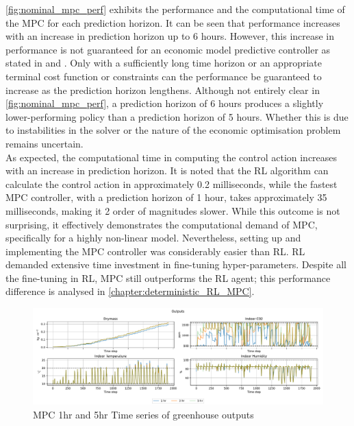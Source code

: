 \autoref{fig:nominal_mpc_perf}  exhibits the performance and the computational time of the MPC for each prediction horizon. It can be seen that performance increases with an increase in prediction horizon up to 6 hours. However, this increase in performance is not guaranteed for an economic model predictive controller as stated in \citet{ellisTutorialReviewEconomic2014}  and \citet{amritEconomicOptimizationUsing2011}. Only with a sufficiently long time horizon or an appropriate terminal cost function or constraints can the performance be guaranteed to increase as the prediction horizon lengthens. Although not entirely clear in \autoref{fig:nominal_mpc_perf}, a prediction horizon of 6 hours produces a slightly lower-performing policy than a prediction horizon of 5 hours. Whether this is due to instabilities in the solver or the nature of the economic optimisation problem remains uncertain.\\
As expected, the computational time in computing the control action increases with an increase in prediction horizon. It is noted that the RL algorithm can calculate the control action in approximately 0.2 milliseconds, while the fastest MPC controller, with a prediction horizon of 1 hour, takes approximately 35 milliseconds, making it 2 order of magnitudes slower. While this outcome is not surprising, it effectively demonstrates the computational demand of MPC, specifically for a highly non-linear model. Nevertheless, setting up and implementing the MPC controller was considerably easier than RL. RL demanded extensive time investment in fine-tuning hyper-parameters. Despite all the fine-tuning in RL, MPC still outperforms the RL agent; this performance difference is analysed in \autoref{chapter:deterministic_RL_MPC}. 
\begin{figure}[H]
	\centering
	\includegraphics[width=\textwidth]{figures/mpc_outputs_time_series.pdf}
	\caption{MPC 1hr and 5hr Time series of greenhouse outputs}
	\label{fig:mpc-timeseries-outputs}
\end{figure}

